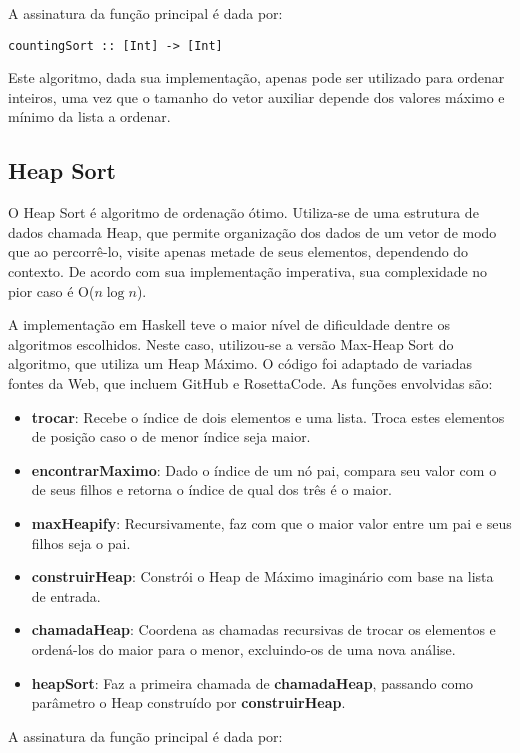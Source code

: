 \documentclass[12pt,a4paper]{article}
\begin{document}
A assinatura da função principal é dada por:

\begin{lstlisting}
countingSort :: [Int] -> [Int]
\end{lstlisting}

Este algoritmo, dada sua implementação, apenas pode ser utilizado para ordenar inteiros, uma vez que o tamanho do vetor auxiliar depende dos valores máximo e mínimo da lista a ordenar.

\subsection{Heap Sort}
O Heap Sort é algoritmo de ordenação ótimo. Utiliza-se de uma estrutura de dados chamada Heap, que permite organização dos dados de um vetor de modo que ao percorrê-lo, visite apenas metade de seus elementos, dependendo do contexto. De acordo com sua implementação imperativa, sua complexidade no pior caso é O($n\log n$).

A implementação em Haskell teve o maior nível de dificuldade dentre os algoritmos escolhidos. Neste caso, utilizou-se a versão Max-Heap Sort do algoritmo, que utiliza um Heap Máximo. O código foi adaptado de variadas fontes da Web, que incluem GitHub e RosettaCode. As funções envolvidas são:

\begin{itemize}
\item \textbf{trocar}: Recebe o índice de dois elementos e uma lista. Troca estes elementos de posição caso o de menor índice seja maior.
\item \textbf{encontrarMaximo}: Dado o índice de um nó pai, compara seu valor com o de seus filhos e retorna o índice de qual dos três é o maior.
\item \textbf{maxHeapify}: Recursivamente, faz com que o maior valor entre um pai e seus filhos seja o pai.
\item \textbf{construirHeap}: Constrói o Heap de Máximo imaginário com base na lista de entrada.
\item \textbf{chamadaHeap}: Coordena as chamadas recursivas de trocar os elementos e ordená-los do maior para o menor, excluindo-os de uma nova análise.
\item \textbf{heapSort}: Faz a primeira chamada de \textbf{chamadaHeap}, passando como parâmetro o Heap construído por \textbf{construirHeap}.
\end{itemize}

A assinatura da função principal é dada por:
\end{document}
